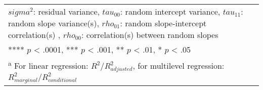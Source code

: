 \begin{landscape}
\begin{table}
\begin{minipage}[t][\textheight][t]{\textwidth}
{\begin{tabular}[t]{lcccccccccccc}
\multicolumn{13}{l}{\rule{0pt}{1em}$sigma^2$: residual variance, $tau_{00}$: random intercept variance, $tau_{11}$: random slope variance(s), $rho_{01}$: random slope-intercept correlation(s) , $rho_{00}$: correlation(s) between random slopes}\\
\multicolumn{13}{l}{\rule{0pt}{1em}**** $p$ < .0001, *** $p$ < .001, ** $p$ < .01, * $p$ < .05}\\
\multicolumn{13}{l}{\rule{0pt}{1em}\textsuperscript{a} For linear regression: $R^2 / R^2_{adjusted}$, for multilevel regression: $R^2_{marginal} / R^2_{conditional}$ }\\
\end{tabular}}
\end{minipage}
\end{table}
\end{landscape}
